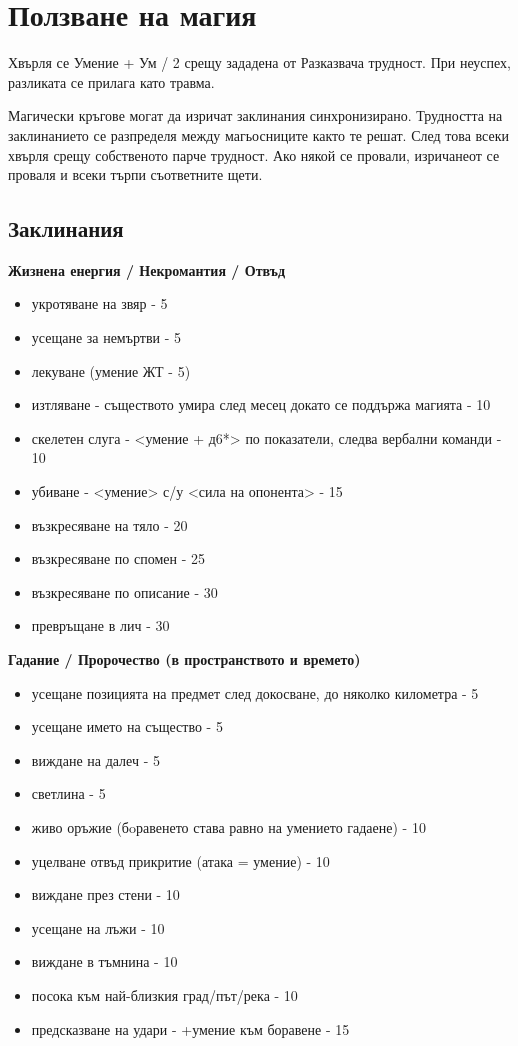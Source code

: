 \section{Ползване на магия}
Хвърля се Умение + Ум / 2 срещу зададена от Разказвача трудност. При
неуспех, разликата се прилага като травма.

Магически кръгове могат да изричат заклинания синхронизирано. Трудността
на заклинанието се разпределя между магьосниците както те решат. След това
всеки хвърля срещу собственото парче трудност. Ако някой се провали,
изричанеот се проваля и всеки търпи съответните щети.


\subsection{Заклинания} 

\textbf{Жизнена енергия / Некромантия / Отвъд} 
\begin{itemize}
  \item{укротяване на звяр - 5}
  \item{усещане за немъртви - 5}
  \item{лекуване (умение ЖТ - 5)}
  \item{изтляване - съществото умира след месец  докато се поддържа магията - 10}
  \item{скелетен слуга - <умение + д6*> по показатели, следва вербални команди - 10}
  \item{убиване - <умение> с/у <сила на опонента> - 15}
  \item{възкресяване на тяло - 20}
  \item{възкресяване по спомен - 25}
  \item{възкресяване по описание - 30}
  \item{превръщане в лич - 30}
\end{itemize}

\vspace{1cm}
\textbf{Гадание / Пророчество (в пространството и времето)}
\begin{itemize}
  \item{усещане позицията на предмет след докосване, до няколко километра - 5}
  \item{усещане името на същество - 5}
  \item{виждане на далеч - 5}
  \item{светлина - 5}
  \item{живо оръжие (бoравенето става равно на умението гадаене) - 10}
  \item{уцелване отвъд прикритие (атака = умение) - 10}
  \item{виждане през стени - 10}
  \item{усещане на лъжи - 10}
  \item{виждане в тъмнина - 10}
  \item{посока към най-близкия град/път/река - 10}
  \item{предсказване на удари - +умение към боравене - 15}
\end{itemize}


